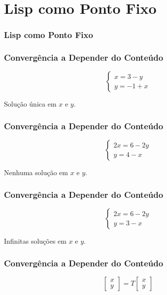 
\section{Lisp como Ponto Fixo}

\begin{frame}
  \frametitle{Lisp como Ponto Fixo}
\end{frame}

\begin{frame}
  \frametitle{Convergência a Depender do Conteúdo}
  \[
    \begin{cases}
      x = 3 - y \\
      y = -1 + x
    \end{cases}
  \]

  \vspace{1cm}

  Solução única em $x$ e $y$.
\end{frame}

\begin{frame}
  \frametitle{Convergência a Depender do Conteúdo}
  \[
    \begin{cases}
      2x = 6 - 2y \\
      y = 4 - x
    \end{cases}
  \]

  \vspace{1cm}

  Nenhuma solução em $x$ e $y$.
\end{frame}

\begin{frame}
  \frametitle{Convergência a Depender do Conteúdo}
  \[
    \begin{cases}
      2x = 6 - 2y \\
      y = 3 - x
    \end{cases}
  \]

  \vspace{1cm}

  Infinitas soluções em $x$ e $y$.
\end{frame}

\begin{frame}
  \frametitle{Convergência a Depender do Conteúdo}
  \[
    \begin{bmatrix}
      x \\ y
    \end{bmatrix}
    =
    T
    \begin{bmatrix}
      x \\ y
    \end{bmatrix}
  \]
\end{frame}

